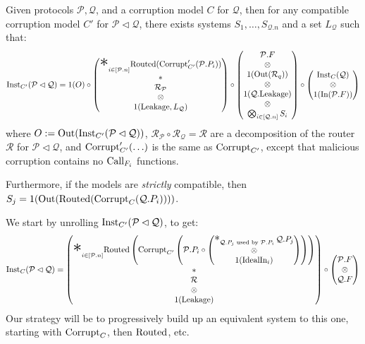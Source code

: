 \begin{theorem}
  \label{thm:horizontal_breakdown}
  Given protocols $\mathcal{P}, \mathcal{Q}$, and a corruption
  model $C$ for $\mathcal{Q}$, then for any compatible corruption
  model $C'$ for $\mathcal{P} \lhd \mathcal{Q}$, there exists
  systems $S_1, \ldots, S_{\mathcal{Q}.n}$ and a set $L_{\mathcal{Q}}$ such that:
  $$
  \tx{Inst}_{C'}(\mathcal{P} \lhd \mathcal{Q}) =
  1(O)\circ
  \begin{pmatrix}
    {\displaystyle \bigast}_{i \in [\mathcal{P}.n]} \tx{Routed}(\tx{Corrupt}'_{C'}(\mathcal{P}.P_i))
    \cr
    *\cr
    \mathcal{R}_{\mathcal{P}}\cr
    \otimes\cr
    1(\tx{Leakage}, L_{\mathcal{Q}})
  \end{pmatrix}
  \circ
  \begin{pmatrix}
    \mathcal{P}.F\cr
    \otimes\cr
    1(\tx{Out}(\mathcal{R}_q))\cr
    \otimes\cr
    1(\mathcal{Q}.\tx{Leakage})\cr
    \otimes\cr
    \bigotimes_{i \in [\mathcal{Q}.n]} S_i\cr
  \end{pmatrix}
  \circ
  \begin{pmatrix}
  \tx{Inst}_C(\mathcal{Q})\cr
  \otimes\cr
  1(\tx{In}(\mathcal{P}.F))
  \end{pmatrix}
  $$
  where $O := \text{Out}(\text{Inst}_{C'}(\mathcal{P} \lhd \mathcal{Q}))$,
  $\mathcal{R}_{\mathcal{P}} \circ \mathcal{R}_{\mathcal{Q}} = \mathcal{R}$
  are a decomposition of the router $\mathcal{R}$ for $\mathcal{P} \lhd \mathcal{Q}$,
  and $\text{Corrupt}'_{C'}(\ldots)$ is the same as $\text{Corrupt}_{C'}$,
  except that malicious corruption contains no $\text{Call}_{F_i}$ functions.

  Furthermore, if the models are \emph{strictly} compatible,
  then $S_j = 1(\text{Out}(\text{Routed}(\text{Corrupt}_C(\mathcal{Q}.P_i))))$.

 We start by unrolling $\text{Inst}_{C'}(\mathcal{P} \lhd \mathcal{Q})$,
to get:
\[
\tx{Inst}_C(\mathcal{P} \lhd \mathcal{Q}) =
  \begin{pmatrix}
    {\displaystyle \bigast}_{i \in [\mathcal{P}.n]} \tx{Routed}\left(\tx{Corrupt}_{C'}\left(\mathcal{P}.P_i \circ 
        
    \begin{pmatrix}
    \bigast_{\mathcal{Q}.P_j \tx{ used by } \mathcal{P}.P_i} \mathcal{Q}.P_j\cr
    \otimes\cr
    1(\tx{IdealIn}_i)
    \end{pmatrix}
    \right)\right)\cr
    *\cr
    \mathcal{R}\cr
    \otimes\cr
    1(\tx{Leakage})
  \end{pmatrix}
  \circ \begin{pmatrix}
    \mathcal{P}.F\cr
    \otimes \cr
    \mathcal{Q}.F
  \end{pmatrix}
\]
Our strategy will be to progressively build up an equivalent system
to this one, starting with $\text{Corrupt}_C$, then $\text{Routed}$, etc.


\end{theorem}
